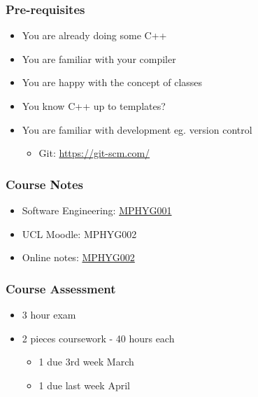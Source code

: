 \subsubsection{Pre-requisites}\label{pre-requisites}

\begin{itemize}
\itemsep1pt\parskip0pt
\item
  You are already doing some C++
\item
  You are familiar with your compiler
\item
  You are happy with the concept of classes
\item
  You know C++ up to templates?
\item
  You are familiar with development eg. version control

  \begin{itemize}
  \itemsep1pt\parskip0pt
  \item
    Git: \url{https://git-scm.com/}
  \end{itemize}
\end{itemize}

\subsubsection{Course Notes}\label{course-notes}

\begin{itemize}
\itemsep1pt\parskip0pt
\item
  Software Engineering:
  \href{http://github-pages.ucl.ac.uk/rsd-engineeringcourse/}{MPHYG001}
\item
  UCL Moodle: MPHYG002
\item
  Online notes:
  \href{http://rits.github-pages.ucl.ac.uk/research-computing-with-cpp/}{MPHYG002}
\end{itemize}

\subsubsection{Course Assessment}\label{course-assessment}

\begin{itemize}
\itemsep1pt\parskip0pt
\item
  3 hour exam
\item
  2 pieces coursework - 40 hours each

  \begin{itemize}
  \itemsep1pt\parskip0pt
  \item
    1 due 3rd week March
  \item
    1 due last week April
  \end{itemize}
\end{itemize}

